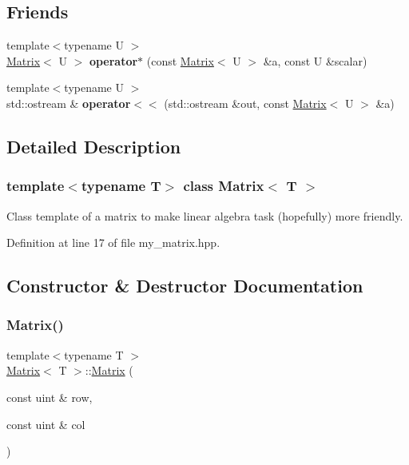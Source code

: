 \subsection*{Friends}
\begin{DoxyCompactItemize}
\item 
\mbox{\label{classMatrix_a1dc63135b1211215f22dd9f691eaf1f9}} 
{\footnotesize template$<$typename U $>$ }\\\hyperlink{classMatrix}{Matrix}$<$ U $>$ {\bfseries operator$\ast$} (const \hyperlink{classMatrix}{Matrix}$<$ U $>$ \&a, const U \&scalar)
\item 
\mbox{\label{classMatrix_abe73619c6b45315d7efd6a2074ed71bd}} 
{\footnotesize template$<$typename U $>$ }\\std\+::ostream \& {\bfseries operator$<$$<$} (std\+::ostream \&out, const \hyperlink{classMatrix}{Matrix}$<$ U $>$ \&a)
\end{DoxyCompactItemize}


\subsection{Detailed Description}
\subsubsection*{template$<$typename T$>$\newline
class Matrix$<$ T $>$}

Class template of a matrix to make linear algebra task (hopefully) more friendly. 

Definition at line 17 of file my\+\_\+matrix.\+hpp.



\subsection{Constructor \& Destructor Documentation}
\mbox{\label{classMatrix_a0e344d342fe0ad5b208c69f9aa909306}} 
\subsubsection{\texorpdfstring{Matrix()}{Matrix()}\hspace{0.1cm}{\footnotesize\ttfamily [1/5]}}
{\footnotesize\ttfamily template$<$typename T $>$ \\
\hyperlink{classMatrix}{Matrix}$<$ T $>$\+::\hyperlink{classMatrix}{Matrix} (\begin{DoxyParamCaption}\item[{const uint \&}]{row,  }\item[{const uint \&}]{col }\end{DoxyParamCaption})}



